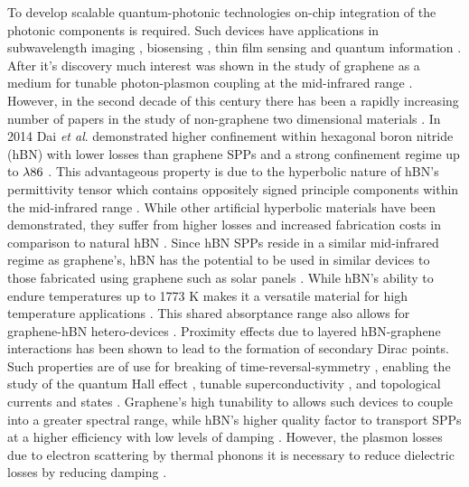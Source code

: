 \documentclass[
reprint,
amsmath,amssymb,
aip,
jap,
floatfix,
]{revtex4-2}
\begin{document}
    To develop scalable quantum-photonic technologies on-chip integration of the photonic components is required. Such devices have applications in subwavelength imaging \cite{Silva:12,Fang:05}, biosensing \cite{Kneipp:97, Talley:05, Rodrigo:15}, thin film sensing \cite{Fali:19} and quantum information \cite{Chang:06, Gonzalez-Tudela:11, Bhimanapati:15}. After it’s discovery much interest was shown in the study of graphene as a medium for tunable photon-plasmon coupling at the mid-infrared range \cite{Koppens:11}. However, in the second decade of this century there has been a rapidly increasing number of papers in the study of non-graphene two dimensional materials \cite{Bhimanapati:15}. In 2014 Dai \textit{et al}. demonstrated higher confinement within hexagonal boron nitride (hBN) with lower losses than graphene SPPs \cite{Dai:14} and a strong confinement regime up to $\rm \lambda 86$ \cite{Caldwell:14}. This advantageous property is due to the hyperbolic nature of hBN’s permittivity tensor which contains oppositely signed principle components within the mid-infrared range \cite{Kumar:15}. While other artificial hyperbolic materials have been demonstrated, they suffer from higher losses and increased fabrication costs in comparison to natural hBN \cite{Biehs:12, Guo:12, Cortes:12}. Since hBN SPPs reside in a similar mid-infrared regime as graphene’s, hBN has the potential to be used in similar devices to those fabricated using graphene such as solar panels \cite{Bonaccorso:10}. While hBN’s ability to endure temperatures up to 1773 K makes it a versatile material for high temperature applications \cite{Jacob:12, Liu:07}. This shared absorptance range also allows for graphene-hBN hetero-devices \cite{Kretinin:14, Dean:10}. Proximity effects due to layered hBN-graphene interactions has been shown to lead to the formation of secondary Dirac points\cite{Dean:13, Hunt:13, Yu:14}. Such properties are of use for breaking of time-reversal-symmetry \cite{Haldane:08, Raghu:08, Chen:19}, enabling the study of the quantum Hall effect \cite{Dean:13, Hunt:13, Yu:14}, tunable superconductivity \cite{Chen:19}, and topological currents and states \cite{Chen:20, Novoselov:16}. Graphene’s high tunability to allows such devices to couple into a greater spectral range, while hBN’s higher quality factor to transport SPPs at a higher efficiency with low levels of damping \cite{Kumar:15, Dean:10, Geim:13, Woessner:15}. However, the plasmon losses due to electron scattering by thermal phonons it is necessary to reduce dielectric losses by reducing damping \cite{Woessner:15}.
\end{document}
